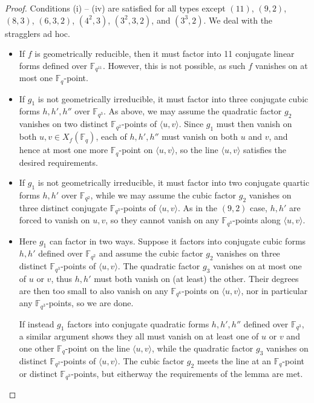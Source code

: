 \documentclass[10pt,a4paper]{amsart}
\newcommand{\F}{\mathbb{F}}
\newcommand{\Span}[1]{\langle #1 \rangle}
\begin{document}
\begin{proof}
    Conditions (i) -- (iv) are satisfied for all types except $(11)$, $(9,2)$, $(8,3)$, $(6,3,2)$, $(4^2,3)$, $(3^2,3,2)$, and $(3^3,2)$. We deal with the stragglers ad hoc.

    \begin{itemize}\setlength{\itemsep}{1ex}
        \item[$(11)$] If $f$ is geometrically reducible, then it must factor into 11 conjugate linear forms defined over $\F_{q^{11}}$. However, this is not possible, as such $f$ vanishes on at most one $\F_q$-point.

        \item[$(9,2)$] If $g_1$ is not geometrically irreducible, it must factor into three conjugate cubic forms $h,h',h''$ over $\F_{q^3}$. As above, we may assume the quadratic factor $g_2$ vanishes on two distinct $\F_{q^2}$-points of $\Span{u,v}$. Since $g_1$ must then vanish on both $u,v \in X_f(\F_q)$, each of $h,h',h''$ must vanish on both $u$ and $v$, and hence at most one more $\F_q$-point on $\Span{u,v}$, so the line $\Span{u,v}$ satisfies the desired requirements.

        \item[$(8,3)$] If $g_1$ is not geometrically irreducible, it must factor into two conjugate quartic forms $h,h'$ over $\F_{q^2}$, while we may assume the cubic factor $g_2$ vanishes on three distinct conjugate $\F_{q^3}$-points of $\Span{u,v}$. As in the $(9,2)$ case, $h,h'$ are forced to vanish on $u,v$, so they cannot vanish on any $\F_{q^3}$-points along $\Span{u,v}$.

        \item[$(6,3,2)$] Here $g_1$ can factor in two ways. Suppose it factors into conjugate cubic forms $h,h'$ defined over $\F_{q^2}$ and assume the cubic factor $g_2$ vanishes on three distinct $\F_{q^3}$-points of $\Span{u,v}$. The quadratic factor $g_3$ vanishes on at most one of $u$ or $v$, thus $h,h'$ must both vanish on (at least) the other. Their degrees are then too small to also vanish on any $\F_{q^6}$-points on $\Span{u,v}$, nor in particular any $\F_{q^3}$-points, so we are done.

        If instead $g_1$ factors into conjugate quadratic forms $h,h',h''$ defined over $\F_{q^3}$, a similar argument shows they all must vanish on at least one of $u$ or $v$ and one other $\F_q$-point on the line $\Span{u,v}$, while the quadratic factor $g_3$ vanishes on distinct $\F_{q^2}$-points of $\Span{u,v}$. The cubic factor $g_2$ meets the line at an $\F_q$-point or distinct $\F_{q^3}$-points, but eitherway the requirements of the lemma are met.


\end{itemize}
\end{proof}
\end{document}
